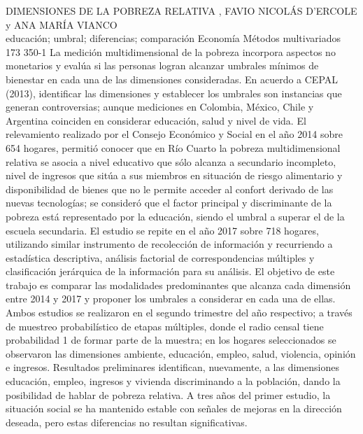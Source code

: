 \A
{DIMENSIONES DE LA POBREZA RELATIVA}
{, FAVIO NICOLÁS D'ERCOLE y ANA MARÍA VIANCO}
{
\\}
{educación; umbral; diferencias; comparación} 
 {Economía} 
 {Métodos multivariados} 
 {173} 
 {350-1}
{La medición multidimensional de la pobreza incorpora aspectos no monetarios y evalúa si las personas logran alcanzar umbrales mínimos de bienestar en cada una de las dimensiones consideradas. En acuerdo a CEPAL (2013), identificar las dimensiones y establecer los umbrales son instancias que generan controversias; aunque mediciones en Colombia, México, Chile y Argentina coinciden en considerar educación, salud y nivel de vida. El relevamiento realizado por el Consejo Económico y Social en el año 2014 sobre 654 hogares, permitió conocer que en Río Cuarto la pobreza multidimensional relativa se asocia a nivel educativo que sólo alcanza a secundario incompleto, nivel de ingresos que sitúa a sus miembros en situación de riesgo alimentario y disponibilidad de bienes que no le permite acceder al confort derivado de las nuevas tecnologías; se consideró que el factor principal y discriminante de la pobreza está representado por la educación, siendo el umbral a superar el de la escuela secundaria. El estudio se repite en el año 2017 sobre 718 hogares, utilizando similar instrumento de recolección de información y recurriendo a estadística descriptiva, análisis factorial de correspondencias múltiples y clasificación jerárquica de la información para su análisis. El objetivo de este trabajo es comparar las modalidades predominantes que alcanza cada dimensión entre 2014 y 2017 y proponer los umbrales a considerar en cada una de ellas. Ambos estudios se realizaron en el segundo trimestre del año respectivo; a través de muestreo probabilístico de etapas múltiples, donde el radio censal tiene probabilidad 1 de formar parte de la muestra; en los hogares seleccionados se observaron las dimensiones ambiente, educación, empleo, salud, violencia, opinión e ingresos. Resultados preliminares identifican, nuevamente, a las dimensiones educación, empleo, ingresos y vivienda discriminando a la población, dando la posibilidad de hablar de pobreza relativa. A tres años del primer estudio, la situación social se ha mantenido estable con señales de mejoras en la dirección deseada, pero estas diferencias no resultan significativas.}
